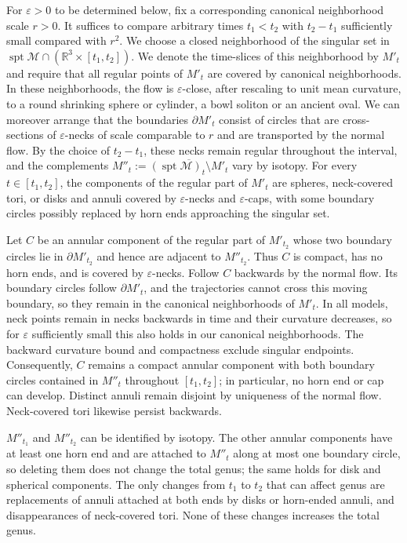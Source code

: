 \documentclass[12pt,twoside,reqno]{amsart}
\newcommand{\IR}{\mathbb{R}}
\newcommand{\MM}{\mathcal{M}}
\newcommand{\eps}{\varepsilon}
\newcommand{\ov}[1]{\overline{#1}}
\DeclareMathOperator{\spt}{spt}
\theoremstyle{definition}
\theoremstyle{remark}
\numberwithin{equation}{section}
\begin{document}
For $\eps>0$ to be determined below, fix a corresponding canonical neighborhood scale $r>0$.
It suffices to compare arbitrary times $t_1<t_2$ with $t_2-t_1$ sufficiently small compared with $r^2$.
We choose a closed neighborhood of the singular set in $\spt\MM\cap(\IR^3\times[t_1,t_2])$.
We denote the time-slices of this neighborhood by $M'_t$ and require that all regular points of $M'_t$ are covered by canonical neighborhoods.
In these neighborhoods, the flow is $\eps$-close, after rescaling to unit mean curvature, to a round shrinking sphere or cylinder, a bowl soliton or an ancient oval.
We can moreover arrange that the boundaries $\partial M'_t$ consist of circles that are cross-sections of $\eps$-necks of scale comparable to $r$ and are transported by the normal flow.
By the choice of $t_2-t_1$, these necks remain regular throughout the interval, and the complements $M''_t:=\ov{(\spt\MM)_t\setminus M'_t}$ vary by isotopy.
For every $t\in[t_1,t_2]$, the components of the regular part of $M'_t$ are spheres, neck-covered tori, or disks and annuli covered by $\eps$-necks and $\eps$-caps, with some boundary circles possibly replaced by horn ends approaching the singular set.

Let $C$ be an annular component of the regular part of $M'_{t_2}$ whose two boundary circles lie in $\partial M'_{t_2}$ and hence are adjacent to $M''_{t_2}$.
Thus $C$ is compact, has no horn ends, and is covered by $\eps$-necks.
Follow $C$ backwards by the normal flow.
Its boundary circles follow $\partial M'_t$, and the trajectories cannot cross this moving boundary, so they remain in the canonical neighborhoods of $M'_t$.
In all models, neck points remain in necks backwards in time and their curvature decreases, so for $\eps$ sufficiently small this also holds in our canonical neighborhoods.
The backward curvature bound and compactness exclude singular endpoints.
Consequently, $C$ remains a compact annular component with both boundary circles contained in $M''_t$ throughout $[t_1,t_2]$; in particular, no horn end or cap can develop.
Distinct annuli remain disjoint by uniqueness of the normal flow.
Neck-covered tori likewise persist backwards.

$M''_{t_1}$ and $M''_{t_2}$ can be identified by isotopy.
The other annular components have at least one horn end and are attached to $M''_t$ along at most one boundary circle, so deleting them does not change the total genus; the same holds for disk and spherical components.
The only changes from $t_1$ to $t_2$ that can affect genus are replacements of annuli attached at both ends by disks or horn-ended annuli, and disappearances of neck-covered tori.
None of these changes increases the total genus.
\end{document}
